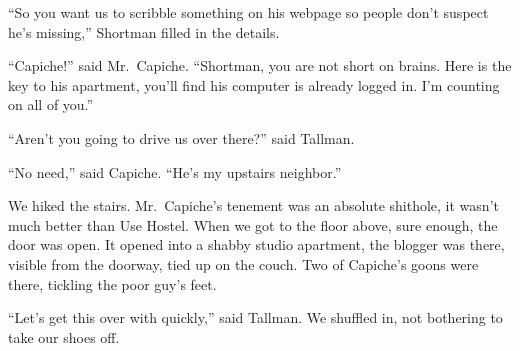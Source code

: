 \documentclass[oneside]{book}
\begin{document}
``So you want us to scribble something on his webpage so people don't suspect
he's missing,'' Shortman filled in the details.

``Capiche!'' said Mr.~Capiche.  ``Shortman, you are not short on brains.
Here is the key to his apartment, you'll find his computer is already logged in.
I'm counting on all of you.''

``Aren't you going to drive us over there?'' said Tallman.

``No need,'' said Capiche.  ``He's my upstairs neighbor.''

\vspace{2mm}

We hiked the stairs.  Mr.~Capiche's tenement was an absolute shithole,
it wasn't much better than Use Hostel.  When we got to the floor above,
sure enough, the door was open.  It opened into a shabby studio apartment,
the blogger was there, visible from the doorway, tied up on the couch.
Two of Capiche's goons were there, tickling the poor guy's feet.

``Let's get this over with quickly,'' said Tallman.  We shuffled in, not bothering
to take our shoes off.


\end{document}
